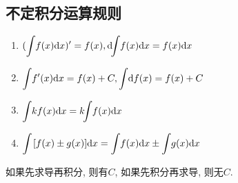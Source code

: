 \subsection{不定积分运算规则}
\begin{enumerate}
    \item $ (\displaystyle\int_{}\hspace{.2em} f(x)\mathrm{d}x)'=f(x), \mathrm{d}\hspace{-.35em}\displaystyle\int_{}\hspace{.2em} f(x)\mathrm{d}x=f(x)\mathrm{d}x $
    \item $ \displaystyle\int_{}\hspace{.2em} f'(x)\mathrm{d}x=f(x)+C, \displaystyle\int_{}\hspace{.2em} \mathrm{d}f(x)=f(x)+C $
    \item $ \displaystyle\int_{}\hspace{.2em} kf(x)\mathrm{d}x=k\hspace{-.35em}\displaystyle\int_{}\hspace{.2em} f(x)\mathrm{d}x $
    \item $ \displaystyle\int_{}\hspace{.5em} [f(x)\pm g(x)]\mathrm{d}x=\displaystyle\int_{}\hspace{.2em} f(x)\mathrm{d}x\pm \displaystyle\int_{}\hspace{.2em} g(x)\mathrm{d}x $
\end{enumerate}\par
如果先求导再积分, 则有$ C $, 如果先积分再求导, 则无$ C $.

